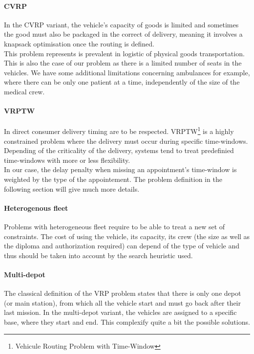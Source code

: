 \documentclass[12pt]{memoir}
\begin{document}
\paragraph{CVRP} %
\label{par:CVRP}
In the CVRP variant, the vehicle's capacity of goods is limited and sometimes the
good must also be packaged in the correct of delivery, meaning it involves a knapsack
optimisation once the routing is defined.\\
This problem represents is prevalent in logistic of physical goods transportation. This is also the case
of our problem as there is a limited number of seats in the vehicles. We have some
additional limitations concerning ambulances for example, where there can be only one
patient at a time, independently of the size of the medical crew.

\paragraph{VRPTW} %
\label{par:VRPTW}
In direct consumer delivery timing are to be respected. VRPTW\footnote{Vehicule
Routing Problem with Time-Window} is a highly constrained problem where the delivery must occur
during specific time-windows. Depending of the criticality of the delivery, systems tend
to treat predefinied time-windows with more or less flexibility. \\ 
In our case, the delay penalty when missing an appointment's time-window is weighted
by the type of the appointement. The problem definition in the following section
will give much more details.

\paragraph{Heterogenous fleet} %
\label{par:Heterogenous fleet}
Problems with heterogeneous fleet require to be able to treat a new set of constraints. The cost of using
the vehicle, its capacity, its crew (the size as well as the diploma and
authorization required) can depend of the type of vehicle and thus should be taken
into account by the search heuristic used.

\paragraph{Multi-depot} %
\label{par:Multi-depot}
The classical definition of the VRP problem states that there is only one depot (or
main station), from which all the vehicle start and must go back after their last
mission. In the multi-depot variant, the vehicles are assigned to a specific base,
where they start and end. This complexify quite a bit the possible solutions.\\
\end{document}

